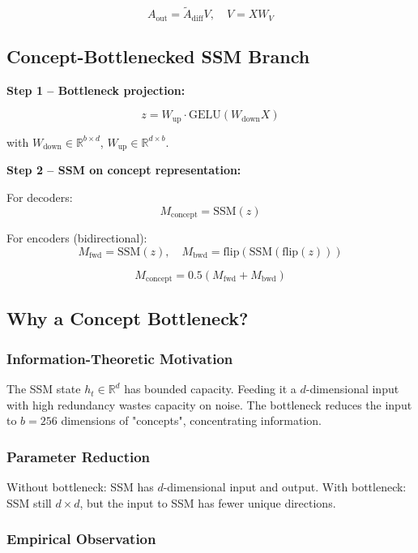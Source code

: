 \[
A_\text{out} = \tilde{A}_\text{diff} V, \quad V = X W_V
\tag{4.4}
\]

\subsection{Concept-Bottlenecked SSM Branch}

\textbf{Step 1 -- Bottleneck projection:}

\[
z = W_\text{up} \cdot \text{GELU}(W_\text{down} X)
\tag{4.5}
\]

with $W_\text{down} \in \mathbb{R}^{b \times d}$, $W_\text{up} \in \mathbb{R}^{d \times b}$.

\textbf{Step 2 -- SSM on concept representation:}

For decoders:
\[
M_\text{concept} = \text{SSM}(z)
\tag{4.6}
\]

For encoders (bidirectional):
\[
M_\text{fwd} = \text{SSM}(z), \quad M_\text{bwd} = \text{flip}(\text{SSM}(\text{flip}(z)))
\tag{4.7}
\]

\[
M_\text{concept} = 0.5(M_\text{fwd} + M_\text{bwd})
\tag{4.8}
\]

\subsection{Why a Concept Bottleneck?}

\subsubsection{Information-Theoretic Motivation}

The SSM state $h_t \in \mathbb{R}^d$ has bounded capacity. Feeding it a 
$d$-dimensional input with high redundancy wastes capacity on noise. The 
bottleneck reduces the input to $b = 256$ dimensions of "concepts", 
concentrating information.

\subsubsection{Parameter Reduction}

Without bottleneck: SSM has $d$-dimensional input and output.
With bottleneck: SSM still $d \times d$, but the input to SSM has fewer 
unique directions.

\subsubsection{Empirical Observation}

